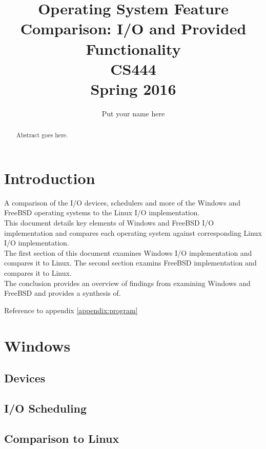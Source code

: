 \documentclass[draftclsnofoot,onecolumn,10pt]{IEEEtran}
\begin{document}
\begin{titlepage}
\title{Operating System Feature Comparison: I/O and Provided Functionality\\CS444\\Spring 2016}
\author{Put your name here}
\maketitle
\begin{abstract}
	Abstract goes here.
\end{abstract}

\thispagestyle{empty} %

\end{titlepage}

\tableofcontents

\newpage

\section{Introduction}
A comparison of the I/O devices, schedulers and more of the Windows and FreeBSD operating systems to the Linux I/O implementation.\\
This document details key elements of Windows and FreeBSD I/O implementation and compares each operating system against corresponding Linux I/O implementation.\\
The first section of this document examines Windows I/O implementation and compares it to Linux. The second section examins FreeBSD implementation and compares it to Linux.\\
The conclusion provides an overview of findings from examining Windows and FreeBSD and provides a synthesis of. \cite{windows}

Reference to appendix \ref{appendix:program}
\section{Windows}

\subsection{Devices}

\subsection{I/O Scheduling}

\subsection{Comparison to Linux}
\end{document}
